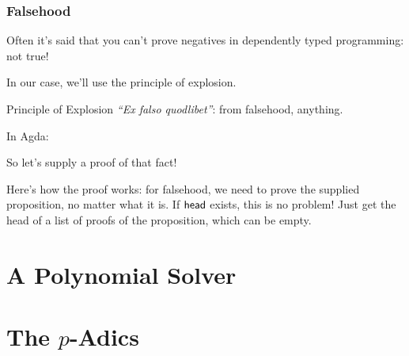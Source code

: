 \documentclass[draft,usenames,dvipsnames]{beamer}
\begin{document}
\begin{frame}
  \frametitle{Falsehood}
  Often it's said that you can't prove negatives in dependently typed
  programming: not true!

  In our case, we'll use the principle of explosion.

  \begin{block}{Principle of Explosion}
    \emph{``Ex falso quodlibet''}: from falsehood, anything.
  \end{block}

  In Agda:

\end{frame}
\begin{frame}
  So let's supply a proof of that fact!


  Here's how the proof works: for falsehood, we need to prove the supplied
  proposition, no matter what it is. If \(\AgdaFunction{head}\) exists, this is
  no problem! Just get the head of a list of proofs of the proposition, which
  can be empty.
\end{frame}
\section{A Polynomial Solver}
\section{The \(p\)-Adics}
\end{document}
